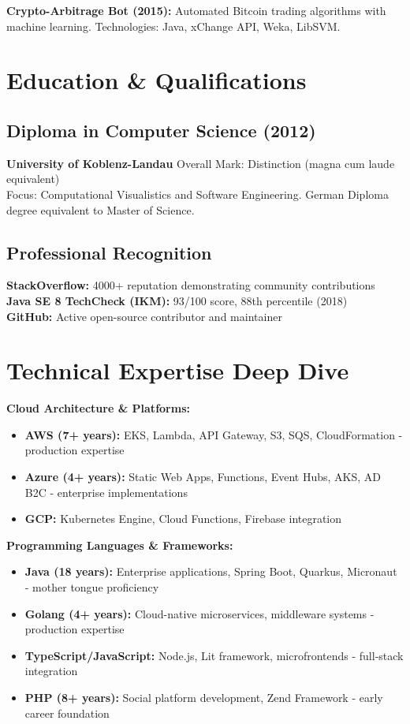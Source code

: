 \documentclass[10pt,a4paper]{article}
\begin{document}
\textbf{Crypto-Arbitrage Bot (2015):} Automated Bitcoin trading algorithms with machine learning. Technologies: Java, xChange API, Weka, LibSVM.

\newpage

\section{Education \& Qualifications}

\subsection{Diploma in Computer Science (2012)}
\textbf{University of Koblenz-Landau} \textbar{} Overall Mark: Distinction (magna cum laude equivalent)\\
Focus: Computational Visualistics and Software Engineering. German Diploma degree equivalent to Master of Science.

\subsection{Professional Recognition}
\textbf{StackOverflow:} 4000+ reputation demonstrating community contributions\\
\textbf{Java SE 8 TechCheck (IKM):} 93/100 score, 88th percentile (2018)\\
\textbf{GitHub:} Active open-source contributor and maintainer

\section{Technical Expertise Deep Dive}

\textbf{Cloud Architecture \& Platforms:}
\begin{itemize}[leftmargin=12pt,itemsep=1pt]
\item \textbf{AWS (7+ years):} EKS, Lambda, API Gateway, S3, SQS, CloudFormation - production expertise
\item \textbf{Azure (4+ years):} Static Web Apps, Functions, Event Hubs, AKS, AD B2C - enterprise implementations  
\item \textbf{GCP:} Kubernetes Engine, Cloud Functions, Firebase integration
\end{itemize}

\textbf{Programming Languages \& Frameworks:}
\begin{itemize}[leftmargin=12pt,itemsep=1pt]
\item \textbf{Java (18 years):} Enterprise applications, Spring Boot, Quarkus, Micronaut - mother tongue proficiency
\item \textbf{Golang (4+ years):} Cloud-native microservices, middleware systems - production expertise
\item \textbf{TypeScript/JavaScript:} Node.js, Lit framework, microfrontends - full-stack integration
\item \textbf{PHP (8+ years):} Social platform development, Zend Framework - early career foundation
\end{itemize}
\end{document}
